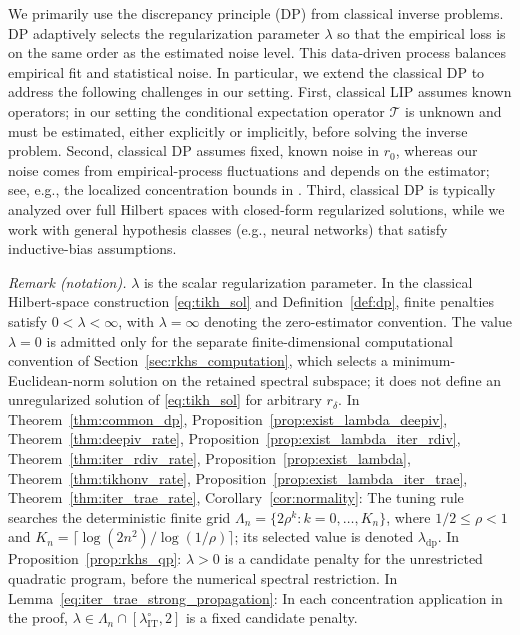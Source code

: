 \documentclass[12pt]{article}
\theoremstyle{plain}
\theoremstyle{definition}
\theoremstyle{remark}
\begin{document}
We primarily use the discrepancy principle (DP) \citep{morozov1966solution} from classical inverse problems. DP adaptively selects the regularization parameter $\lambda$ so that the empirical loss is on the same order as the estimated noise level. This data-driven process balances empirical fit and statistical noise. In particular, we extend the classical DP to address the following challenges in our setting. First, classical LIP assumes known operators; in our setting the conditional expectation operator $\mathcal{T}$ is unknown and must be estimated, either explicitly or implicitly, before solving the inverse problem. Second, classical DP assumes fixed, known noise in $r_0$, whereas our noise comes from empirical-process fluctuations and depends on the estimator; see, e.g., the localized concentration bounds in \citet[Lemma~14]{foster2023orthogonal}. Third, classical DP is typically analyzed over full Hilbert spaces with closed-form regularized solutions, while we work with general hypothesis classes (e.g., neural networks) that satisfy inductive-bias assumptions.

\noindent\textit{Remark (notation).} $\lambda$ is the scalar regularization parameter. In the classical Hilbert-space construction \eqref{eq:tikh_sol} and Definition~\ref{def:dp}, finite penalties satisfy $0<\lambda<\infty$, with $\lambda=\infty$ denoting the zero-estimator convention. The value $\lambda=0$ is admitted only for the separate finite-dimensional computational convention of Section~\ref{sec:rkhs_computation}, which selects a minimum-Euclidean-norm solution on the retained spectral subspace; it does not define an unregularized solution of \eqref{eq:tikh_sol} for arbitrary $r_\delta$. In Theorem~\ref{thm:common_dp}, Proposition~\ref{prop:exist_lambda_deepiv}, Theorem~\ref{thm:deepiv_rate}, Proposition~\ref{prop:exist_lambda_iter_rdiv}, Theorem~\ref{thm:iter_rdiv_rate}, Proposition~\ref{prop:exist_lambda}, Theorem~\ref{thm:tikhonv_rate}, Proposition~\ref{prop:exist_lambda_iter_trae}, Theorem~\ref{thm:iter_trae_rate}, Corollary~\ref{cor:normality}: The tuning rule searches the deterministic finite grid $\Lambda_n=\{2\rho^k:k=0,\ldots,K_n\}$, where $1/2\leqslant\rho<1$ and $K_n=\lceil\log(2n^2)/\log(1/\rho)\rceil$; its selected value is denoted $\lambda_{\mathrm{dp}}$. In Proposition~\ref{prop:rkhs_qp}: $\lambda>0$ is a candidate penalty for the unrestricted quadratic program, before the numerical spectral restriction. In Lemma~\ref{eq:iter_trae_strong_propagation}: In each concentration application in the proof, $\lambda\in\Lambda_n\cap[\lambda_{\mathrm{IT}}^\circ,2]$ is a fixed candidate penalty.
\end{document}
